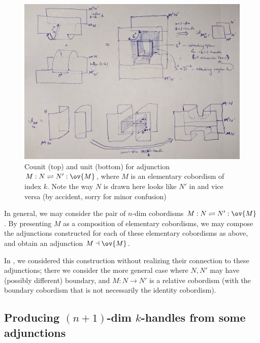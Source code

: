 \documentclass[12pt]{article}
\begin{document}
\begin{figure}[ht]
\includegraphics[width=15cm]{diagram-counit-unit-elementary-cobord.jpg}
\caption{Counit (top) and unit (bottom) for adjunction
$M: N \rightleftharpoons N': \ov{M}$,
where $M$ is an elementary cobordism of index $k$.
Note the way $N$ is drawn here looks like $N'$
in  and vice versa
(by accident, sorry for minor confusion)}
\label{f:elementary-cobord-counit-unit}
\end{figure}



In general, we may consider the pair of $n$-dim cobordisms
$M : N \rightleftharpoons N': \ov{M}$.
By presenting $M$ as a composition of elementary cobordisms,
we may compose the adjunctions constructed
for each of these elementary cobordisms as above,
and obtain an adjunction $M \dashv \ov{M}$.



\begin{remark}
In \cite{Yprod},
we considered this construction
without realizing their connection to these adjunctions;
there we consider the more general case where
$N,N'$ may have (possibly different) boundary, and
$M: N \to N'$ is a relative cobordism
(with the boundary cobordism that is
not necessarily the identity cobordism).
\end{remark}


\subsection{Producing $(n+1)$-dim $k$-handles
from some adjunctions}
\label{s:handles-from-adjunctions}
\end{document}

